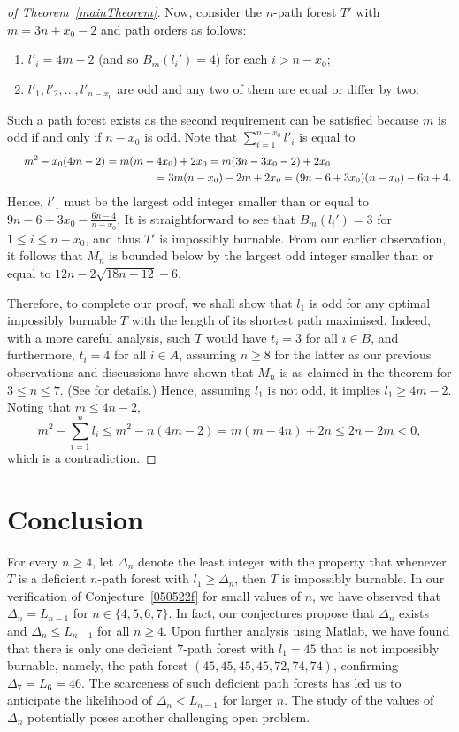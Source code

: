 \documentclass[
final
]{dmtcs-episciences}
\theoremstyle{definition}
\theoremstyle{remark}
\begin{document}
\begin{proof}[of Theorem~\ref{mainTheorem}]
	
	Now, consider the $n$-path forest $T'$ with $m=3n+x_0-2$ and path orders as follows: 
	\begin{enumerate}
		\item 	$l'_i = 4m-2$ (and so $B_m(l_i')=4$) for each $i>n-x_0$;
		\item $l'_1, l'_2, \dots, l'_{n-x_0}$ are odd and any two of them are equal or differ by two. 	
	\end{enumerate} 	
	Such a path forest exists as the second requirement can be satisfied because $m$ is odd if and only if $n-x_0$ is odd. Note that $\sum_{i=1}^{n-x_0} l'_i$ is equal to
	\begin{eqnarray*}
	m^2 - x_0(4m-2)  =  m(m-4x_0)+2x_0  =  m(3n-3x_0-2) +2x_0  \hspace*{39mm}	\\
	 \hspace*{48mm}  =3m(n-x_0)-2m+2x_0= (9n-6+3x_0)(n-x_0)-6n+4. 	
	\end{eqnarray*}
	Hence, $l'_1$ must be the largest odd integer smaller than or equal to $9n -6 +3x_0 - \frac{6n-4}{n-x_0}$. 
	It is straightforward to see that $B_m(l_i')=3$ for $1\leq i\leq n-x_0$, and thus $T'$ is impossibly burnable.
	From our earlier observation, it follows that $M_n$ is bounded below by the 
	largest odd integer smaller than or equal to $12n - 2\sqrt{18n - 12} - 6$.
	
	Therefore, to complete our proof, we shall show that $l_1$ is odd for any optimal impossibly burnable $T$ with the length of its shortest path maximised. Indeed, with a more careful analysis, such $T$ would have $t_i=3$ for all $i\in B$, and furthermore,  $t_i = 4$ for all $i\in A$, assuming $n\geq 8$ for the latter as our previous observations and discussions have shown that $M_n$ is as claimed in the theorem for $3\le n \le 7$. (See  for details.) Hence, assuming $l_1$ is not odd, it implies $l_1\geq 4m-2$.  Noting that $m\le 4n-2$,
	$$m^2-\sum_{i=1}^n l_i\le m^2- n(4m-2)=m(m-4n) +2n \leq 2n-2m<0,$$
	which is a contradiction. 
\end{proof}


\section{Conclusion}

For every $n\geq 4$, let $\Delta_n$ denote the least integer with the property that whenever $T$ is a deficient $n$-path forest with $l_1\geq \Delta_n$, then $T$ is impossibly burnable.
In our verification of Conjecture~\ref{050522f} for small values of $n$, we have observed that $\Delta_n = L_{n-1}$ for $n\in \{4,5,6,7\}$. In fact, our conjectures propose that $\Delta_n$ exists and $\Delta_n \leq L_{n-1}$ for all $n\geq 4$.
Upon further analysis using Matlab, we have found that there is only one deficient $7$-path forest with $l_1=45$ that is not impossibly burnable, namely, the path forest $(45,45,45,45,72,74,74)$, confirming $\Delta_7 = L_6=46$.
The scarceness of such deficient path forests has led us to anticipate the likelihood of $\Delta_n< L_{n-1}$ for larger $n$.
The study of the values of $\Delta_n$ potentially poses another challenging open problem.
\end{document}
